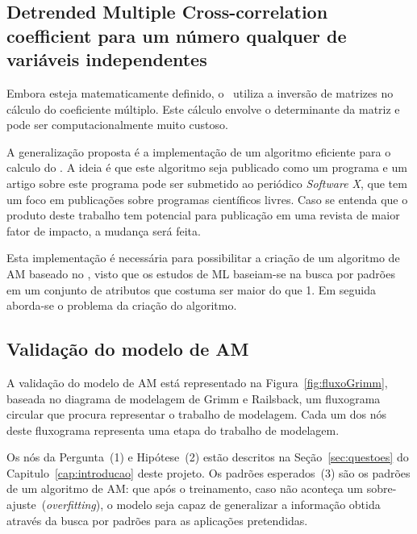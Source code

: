 \subsection{Detrended Multiple Cross-correlation coefficient para um número qualquer de variáveis independentes}

Embora esteja matematicamente definido, o \dmc~utiliza a inversão de matrizes no cálculo do coeficiente múltiplo. Este cálculo envolve o determinante da matriz e pode ser computacionalmente muito custoso.

A generalização proposta é a implementação de um algoritmo eficiente para o calculo do \dmc. A ideia é que este algoritmo seja publicado como um programa e um artigo sobre este programa pode ser submetido ao periódico \emph{Software X}, que tem um foco em publicações sobre programas científicos livres. Caso se entenda que o produto deste trabalho tem potencial para publicação em uma revista de maior fator de impacto, a mudança será feita.

Esta implementação é necessária para possibilitar a criação de um algoritmo de AM baseado no \dmc, visto que os estudos de ML baseiam-se na busca por padrões em um conjunto de atributos que costuma ser maior do que 1. Em seguida aborda-se o problema da criação do algoritmo.


\subsection{Validação do modelo de AM}
\label{ssec:vlalid}
A validação do modelo de AM está representado na Figura~\ref{fig:fluxoGrimm}, baseada no diagrama de modelagem de Grimm e Railsback, um fluxograma circular que procura representar o trabalho de modelagem. Cada um dos nós deste fluxograma representa uma etapa do trabalho de modelagem.

Os nós da Pergunta~(1) e Hipótese~(2) estão descritos na Seção~\ref{sec:questoes} do Capitulo~\ref{cap:introducao} deste projeto. Os padrões esperados~(3) são os padrões de um algoritmo de AM: que após o treinamento, caso não aconteça um sobre-ajuste~(\emph{overfitting}), o modelo seja capaz de generalizar a informação obtida através da busca por padrões para as aplicações pretendidas.

